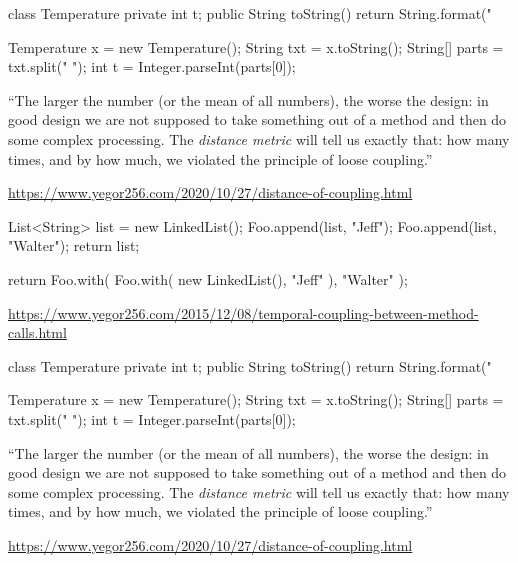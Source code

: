\documentclass{article}
\begin{document}
\begin{multicols}{2}
{\scriptsize\begin{ffcode}
class Temperature {
  private int t;
  public String toString() {
    return String.format("%
  }
}

Temperature x = new Temperature();
String txt = x.toString();
String[] parts = txt.split(" ");
int t = Integer.parseInt(parts[0]);
\end{ffcode}
}
\par\columnbreak\par
``The larger the number (or the mean of all numbers), the worse the design: in good design we are not supposed to take something out of a method and then do some complex processing. The \emph{distance metric} will tell us exactly that: how many times, and by how much, we violated the principle of loose coupling.''\par
{\scriptsize \url{https://www.yegor256.com/2020/10/27/distance-of-coupling.html}\par}
\end{multicols}
\plush{}

\begin{multicols}{2}
{\small\begin{ffcode}
List<String> list =
  new LinkedList();
Foo.append(list, "Jeff");
Foo.append(list, "Walter");
return list;
\end{ffcode}
}
\par\columnbreak\par
{\small\begin{ffcode}
return Foo.with(
  Foo.with(
    new LinkedList(),
    "Jeff"
  ),
  "Walter"
);
\end{ffcode}
}
\end{multicols}\par
{\scriptsize \url{https://www.yegor256.com/2015/12/08/temporal-coupling-between-method-calls.html}\par}
\plush{}

\begin{multicols}{2}
{\scriptsize\begin{ffcode}
class Temperature {
  private int t;
  public String toString() {
    return String.format("%
  }
}

Temperature x = new Temperature();
String txt = x.toString();
String[] parts = txt.split(" ");
int t = Integer.parseInt(parts[0]);
\end{ffcode}
}
\par\columnbreak\par
``The larger the number (or the mean of all numbers), the worse the design: in good design we are not supposed to take something out of a method and then do some complex processing. The \emph{distance metric} will tell us exactly that: how many times, and by how much, we violated the principle of loose coupling.''\par
{\scriptsize \url{https://www.yegor256.com/2020/10/27/distance-of-coupling.html}\par}
\end{multicols}
\plush{}
\end{document}
